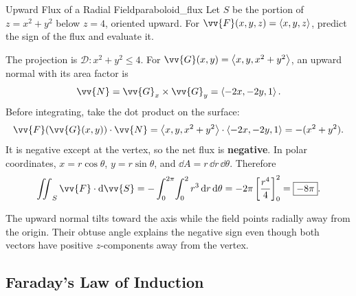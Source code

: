 \begin{problem}{Upward Flux of a Radial Field}{paraboloid_flux}
Let $S$ be the portion of $z = x^2 + y^2$ below $z = 4$, oriented upward.
For $\vv{F}(x,y,z) = \ang{x,y,z}$, predict the sign of the flux and evaluate it.
\end{problem}
\begin{sol}
The projection is $\mathcal{D}: x^2 + y^2 \le 4$. For
$\vv{G}(x,y) = \ang{x,y,x^2 + y^2}$, an upward normal with its area factor is
\[
    \vv{N} = \vv{G}_x \times \vv{G}_y = \ang{-2x,-2y,1}.
\]
Before integrating, take the dot product on the surface:
\[
    \vv{F}(\vv{G}(x,y))\cdot\vv{N}
    = \ang{x,y,x^2 + y^2}\cdot\ang{-2x,-2y,1}
    = -(x^2 + y^2).
\]
It is negative except at the vertex, so the net flux is \textbf{negative}.
In polar coordinates, $x = r\cos\theta$, $y = r\sin\theta$, and $\dd{A} = r\,\dd{r}\,\dd{\theta}$. Therefore
\[
    \iint_S \vv{F}\cdot\dd{\vv{S}}
    = -\int_0^{2\pi}\!\int_0^2 r^3\,\dd{r}\,\dd{\theta}
    = -2\pi\left[\frac{r^4}{4}\right]_0^2
    = \boxed{-8\pi}.
\]
\end{sol}

\begin{center}
\end{center}

The upward normal tilts toward the axis while the field points radially away from the origin. Their obtuse angle explains the negative sign even though both vectors have positive $z$-components away from the vertex.

\newpage
\subsection{Faraday's Law of Induction}

